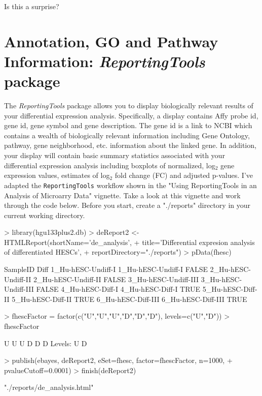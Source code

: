 \documentclass[12pt]{article}
\newcommand{\code}[1]{{\texttt{#1}}}
\begin{document}
Is this a surprise?  

\section{Annotation, GO and Pathway Information: {\it ReportingTools} package}      

The {\it ReportingTools} package allows you to display biologically relevant results of your differential expression analysis.  Specifically, a display contains Affy probe id, gene id, gene symbol and gene description.  The gene id is a link to NCBI which contains a wealth of biologically relevant information including Gene Ontology, pathway, gene neighborhood, etc. information about the linked gene.  In addition, your display will contain basic summary statistics associated with your differential expression analysis including boxplots of normalized, log$_2$ gene expression values, estimates of log$_2$ fold change (FC) and adjusted p-values.  I've adapted the \code{ReportingTools} workflow shown in the "Using ReportingTools in an Analysis of Microarry Data" vignette.  Take a look at this vignette and work through the code below.  Before you start, create a "./reports" directory in your current working directory.  

\begin{Schunk}
\begin{Sinput}
> library(hgu133plus2.db)
> deReport2 <- HTMLReport(shortName='de_analysis', 
+ title='Differential expresion analysis of differentiated HESCs', 
+ reportDirectory="./reports")
> pData(fhesc)
\end{Sinput}
\begin{Soutput}
                                 SampleID  Diff
1_Hu-hESC-Undiff-I     1_Hu-hESC-Undiff-I FALSE
2_Hu-hESC-Undiff-II   2_Hu-hESC-Undiff-II FALSE
3_Hu-hESC-Undiff-III 3_Hu-hESC-Undiff-III FALSE
4_Hu-hESC-Diff-I         4_Hu-hESC-Diff-I  TRUE
5_Hu-hESC-Diff-II       5_Hu-hESC-Diff-II  TRUE
6_Hu-hESC-Diff-III     6_Hu-hESC-Diff-III  TRUE
\end{Soutput}
\begin{Sinput}
> fhescFactor = factor(c("U","U","U","D","D","D"), levels=c("U","D"))
> fhescFactor
\end{Sinput}
\begin{Soutput}
[1] U U U D D D
Levels: U D
\end{Soutput}
\begin{Sinput}
> publish(ebayes, deReport2, eSet=fhesc, factor=fhescFactor, n=1000, 
+ pvalueCutoff=0.0001)
> finish(deReport2)
\end{Sinput}
\begin{Soutput}
[1] "./reports/de_analysis.html"
\end{Soutput}
\end{Schunk}
\end{document}
